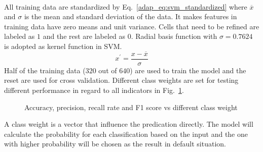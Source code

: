 \paragraph{}
All training data are standardized by Eq.~\ref{adap_eq:svm_standardized} where $\overline{x}$ and $\sigma$ is the mean and standard deviation of the data.
It makes features in training data have zero means and unit variance.
Cells that need to be refined are labeled as $1$ and the rest are labeled as $0$.
Radial basis function with $\sigma=0.7624$ is adopted as kernel function in SVM.
    \begin{equation}
        x^\prime = \frac{x-\overline{x}}{\sigma}
        \label{adap_eq:svm_standardized}
    \end{equation}
Half of the training data ($320$ out of $640$) are used to train the model and the reset are used for cross validation.
Different class weights are set for testing different performance in regard to all indicators in Fig.~\ref{adap_fig:svm_performance_0}.
\begin{figure}[h!]
    \centering
    \caption{Accuracy, precision, recall rate and F1 score vs different class weight}
    \label{adap_fig:svm_performance_0}
\end{figure}
%
A class weight is a vector that influence the predication directly.
The model will calculate the probability for each classification based on the input and the one with higher probability will be chosen as the result in default situation.
